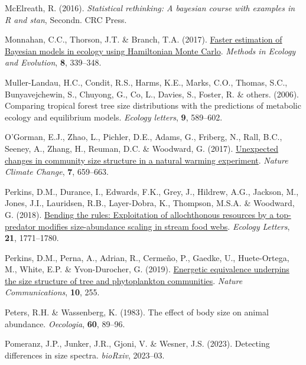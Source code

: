 \documentclass[
  12pt,
]{article}
\newlength{\cslhangindent}
\newlength{\cslentryspacingunit} %
\newenvironment{CSLReferences}[2] %
 {%
  \setlength{\parindent}{0pt}
  \ifodd #1
  \let\oldpar\par
  \def\par{\hangindent=\cslhangindent\oldpar}
  \fi
  \setlength{\parskip}{#2\cslentryspacingunit}
 }%
 {}
\begin{document}
\begin{CSLReferences}{1}{0}
\leavevmode{}%
McElreath, R. (2016). \emph{Statistical rethinking: {A} bayesian course
with examples in {R} and stan}, Secondn. {CRC Press}.

\leavevmode{}%
Monnahan, C.C., Thorson, J.T. \& Branch, T.A. (2017).
\href{https://doi.org/10.1111/2041-210X.12681}{Faster estimation of
{Bayesian} models in ecology using {Hamiltonian Monte Carlo}}.
\emph{Methods in Ecology and Evolution}, \textbf{8}, 339--348.

\leavevmode{}%
Muller-Landau, H.C., Condit, R.S., Harms, K.E., Marks, C.O., Thomas,
S.C., Bunyavejchewin, S., Chuyong, G., Co, L., Davies, S., Foster, R. \&
others. (2006). Comparing tropical forest tree size distributions with
the predictions of metabolic ecology and equilibrium models.
\emph{Ecology letters}, \textbf{9}, 589--602.

\leavevmode{}%
O'Gorman, E.J., Zhao, L., Pichler, D.E., Adams, G., Friberg, N., Rall,
B.C., Seeney, A., Zhang, H., Reuman, D.C. \& Woodward, G. (2017).
\href{https://doi.org/10.1038/nclimate3368}{Unexpected changes in
community size structure in a natural warming experiment}. \emph{Nature
Climate Change}, \textbf{7}, 659--663.

\leavevmode{}%
Perkins, D.M., Durance, I., Edwards, F.K., Grey, J., Hildrew, A.G.,
Jackson, M., Jones, J.I., Lauridsen, R.B., Layer-Dobra, K., Thompson,
M.S.A. \& Woodward, G. (2018).
\href{https://doi.org/10.1111/ele.13147}{Bending the rules: Exploitation
of allochthonous resources by a top-predator modifies size-abundance
scaling in stream food webs}. \emph{Ecology Letters}, \textbf{21},
1771--1780.

\leavevmode{}%
Perkins, D.M., Perna, A., Adrian, R., Cermeño, P., Gaedke, U.,
Huete-Ortega, M., White, E.P. \& Yvon-Durocher, G. (2019).
\href{https://doi.org/10.1038/s41467-018-08039-3}{Energetic equivalence
underpins the size structure of tree and phytoplankton communities}.
\emph{Nature Communications}, \textbf{10}, 255.

\leavevmode{}%
Peters, R.H. \& Wassenberg, K. (1983). The effect of body size on animal
abundance. \emph{Oecologia}, \textbf{60}, 89--96.

\leavevmode{}%
Pomeranz, J.P., Junker, J.R., Gjoni, V. \& Wesner, J.S. (2023).
Detecting differences in size spectra. \emph{bioRxiv}, 2023--03.


\end{CSLReferences}
\end{document}

